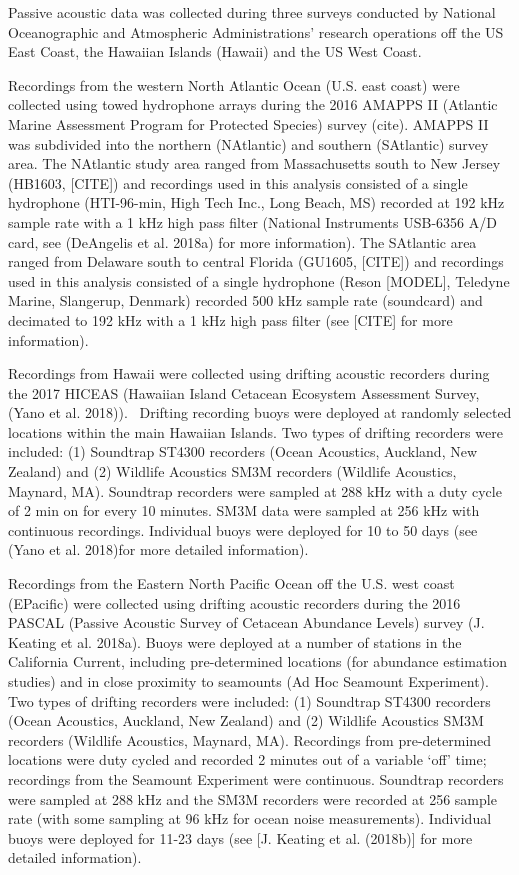 \documentclass[
  letterpaper,
  DIV=11,
  numbers=noendperiod]{scrartcl}
\begin{document}
Passive acoustic data was collected during three surveys conducted by
National Oceanographic and Atmospheric Administrations' research
operations off the US East Coast, the Hawaiian Islands (Hawaii) and the
US West Coast.

Recordings from the western North Atlantic Ocean (U.S. east coast) were
collected using towed hydrophone arrays during the 2016 AMAPPS II
(Atlantic Marine Assessment Program for Protected Species) survey
(cite). AMAPPS II was subdivided into the northern (NAtlantic) and
southern (SAtlantic) survey area. The NAtlantic study area ranged from
Massachusetts south to New Jersey (HB1603, {[}CITE{]}) and recordings
used in this analysis consisted of a single hydrophone (HTI-96-min, High
Tech Inc., Long Beach, MS) recorded at 192 kHz sample rate with a 1 kHz
high pass filter (National Instruments USB-6356 A/D card, see (DeAngelis
et al. 2018a) for more information). The SAtlantic area ranged from
Delaware south to central Florida (GU1605, {[}CITE{]}) and recordings
used in this analysis consisted of a single hydrophone (Reson
{[}MODEL{]}, Teledyne Marine, Slangerup, Denmark) recorded 500 kHz
sample rate (soundcard) and decimated to 192 kHz with a 1 kHz high pass
filter (see {[}CITE{]} for more information).

Recordings from Hawaii were collected using drifting acoustic recorders
during the 2017 HICEAS (Hawaiian Island Cetacean Ecosystem Assessment
Survey, (Yano et al. 2018)).~ Drifting recording buoys were deployed at
randomly selected locations within the main Hawaiian Islands. Two types
of drifting recorders were included: (1) Soundtrap ST4300 recorders
(Ocean Acoustics, Auckland, New Zealand) and (2) Wildlife Acoustics SM3M
recorders (Wildlife Acoustics, Maynard, MA). Soundtrap recorders were
sampled at 288 kHz with a duty cycle of 2 min on for every 10 minutes.
SM3M data were sampled at 256 kHz with continuous recordings. Individual
buoys were deployed for 10 to 50 days (see (Yano et al. 2018)for more
detailed information).

Recordings from the Eastern North Pacific Ocean off the U.S. west coast
(EPacific) were collected using drifting acoustic recorders during the
2016 PASCAL (Passive Acoustic Survey of Cetacean Abundance Levels)
survey (J. Keating et al. 2018a). Buoys were deployed at a number of
stations in the California Current, including pre-determined locations
(for abundance estimation studies) and in close proximity to seamounts
(Ad Hoc Seamount Experiment). Two types of drifting recorders were
included: (1) Soundtrap ST4300 recorders (Ocean Acoustics, Auckland, New
Zealand) and (2) Wildlife Acoustics SM3M recorders (Wildlife Acoustics,
Maynard, MA). Recordings from pre-determined locations were duty cycled
and recorded 2 minutes out of a variable `off' time; recordings from the
Seamount Experiment were continuous. Soundtrap recorders were sampled at
288 kHz and the SM3M recorders were recorded at 256 sample rate (with
some sampling at 96 kHz for ocean noise measurements). Individual buoys
were deployed for 11-23 days (see {[}J. Keating et al. (2018b){]} for
more detailed information).
\end{document}
